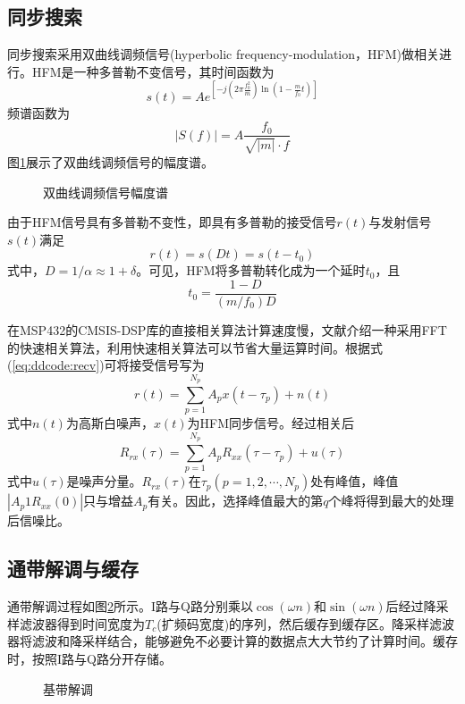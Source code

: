 \subsection{同步搜索}
同步搜索采用双曲线调频信号(hyperbolic frequency-modulation，HFM)做相关进行。HFM是一种多普勒不变信号，其时间函数为
\begin{equation}
s(t)=Ae^{\left[-j\left(2\pi\frac{f_0^2}{m}\right)\ln\left(1-\frac{m}{f_0} t\right)\right]}
\end{equation}
频谱函数为
\begin{equation}
|S(f)|=A\frac{f_0}{\sqrt{|m|}\cdot f}
\end{equation}
图\ref{fig:software:hfm}展示了双曲线调频信号的幅度谱。
\begin{figure}[htbp]
	\centering
	
	\caption{双曲线调频信号幅度谱}
	\label{fig:software:hfm}
\end{figure}

由于HFM信号具有多普勒不变性，即具有多普勒的接受信号$r(t)$与发射信号$s(t)$满足
\begin{equation}
r(t)=s(Dt)=s(t-t_0)
\end{equation}
式中，$D=1/\alpha\approx1+\delta$。可见，HFM将多普勒转化成为一个延时$t_0$，且
\begin{equation}
t_0=\frac{1-D}{(m/f_0)D}
\end{equation}

在MSP432的CMSIS-DSP库的直接相关算法计算速度慢，文献\cite{press2007numerical}介绍一种采用FFT的快速相关算法，利用快速相关算法可以节省大量运算时间。根据式(\ref{eq:ddcode:recv})可将接受信号写为
\begin{equation}
r(t)=\sum_{p=1}^{N_p}A_px(t-\tau_p)+n(t)
\end{equation}
式中$n(t)$为高斯白噪声，$x(t)$为HFM同步信号。经过相关后
\begin{equation}
R_{rx}(\tau)=\sum_{p=1}^{N_p}A_pR_{xx}(\tau-\tau_p)+u(\tau)
\end{equation}
式中$u(\tau)$是噪声分量。$R_{rx}(\tau)$在$\tau_p(p=1,2,\cdots,N_p)$处有峰值，峰值$|A_p1R_{xx}(0)|$只与增益$A_p$有关。因此，选择峰值最大的第$q$个峰将得到最大的处理后信噪比。

\subsection{通带解调与缓存}
通带解调过程如图\ref{fig:software:pass}所示。I路与Q路分别乘以$\cos(\omega n)$和$\sin(\omega n)$后经过降采样滤波器得到时间宽度为$T_c$(扩频码宽度)的序列，然后缓存到缓存区。降采样滤波器将滤波和降采样结合，能够避免不必要计算的数据点大大节约了计算时间。缓存时，按照I路与Q路分开存储。
\begin{figure}[htbp]
	\centering
	
	\caption{基带解调}
	\label{fig:software:pass}
\end{figure}

